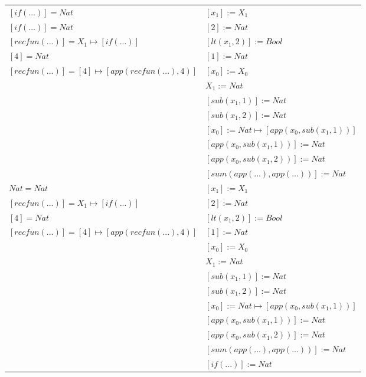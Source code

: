 \begin{exercise}
\begin{description}
\begin{center}
\begin{longtable}{ | l | l | }
                    \hline
                        $[if(...)] = Nat $ & $[x_1] := X_1$ \\
                        $[if(...)] = Nat $ & $[2] := Nat$ \\
                        $[recfun(...)] = X_1 \mapsto [if(...)]$ & $[lt(x_1 , 2)] := Bool$ \\
                        $[4] = Nat$ & $[1] := Nat$ \\
                        $[recfun(...)] = [4] \mapsto [app(recfun(...), 4)]$ & $[x_0] := X_0$ \\
                        & $X_1 := Nat$ \\
                        & $[sub(x_1,1)] := Nat$ \\
                        & $[sub(x_1,2)] := Nat$ \\
                        & $[x_0] := Nat \mapsto [app(x_0, sub(x_1,1))]$ \\
                        & $[app(x_0, sub(x_1,1))] := Nat$ \\
                        & $[app(x_0, sub(x_1,2))] := Nat$ \\
                        & $[sum(app(...), app(...))] := Nat $ \\
                    \hline
                        $Nat = Nat $ & $[x_1] := X_1$ \\
                        $[recfun(...)] = X_1 \mapsto [if(...)]$ & $[2] := Nat$ \\
                        $[4] = Nat$ & $[lt(x_1 , 2)] := Bool$ \\
                        $[recfun(...)] = [4] \mapsto [app(recfun(...), 4)]$ & $[1] := Nat$\\
                        & $[x_0] := X_0$ \\
                        & $X_1 := Nat$ \\
                        & $[sub(x_1,1)] := Nat$ \\
                        & $[sub(x_1,2)] := Nat$ \\
                        & $[x_0] := Nat \mapsto [app(x_0, sub(x_1,1))]$ \\
                        & $[app(x_0, sub(x_1,1))] := Nat$ \\
                        & $[app(x_0, sub(x_1,2))] := Nat$ \\
                        & $[sum(app(...), app(...))] := Nat$ \\
                        & $[if(...)] := Nat $ \\

\end{longtable}
\end{center}
\end{description}
\end{exercise}
